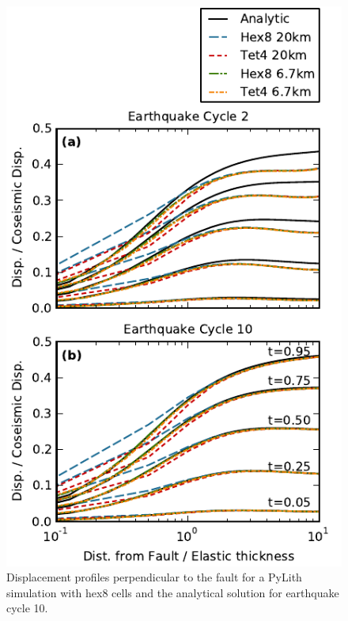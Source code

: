 \begin{figure}
\begin{centering}
\includegraphics[scale=0.66]{benchmarks/savageprescott/figs/soln_profiles}
\par\end{centering}

\caption{Displacement profiles perpendicular to the fault for a PyLith simulation
with hex8 cells and the analytical solution for earthquake cycle 10.
\label{fig:benchmark:savageprescott:solution}}
\end{figure}

